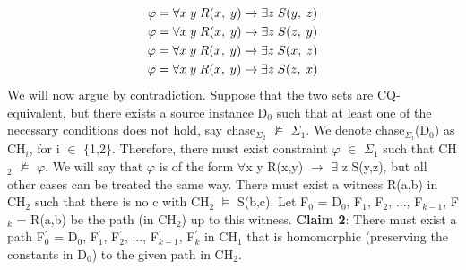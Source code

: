 \documentclass[11pt, a4paper, dvipsnames]{article}
\begin{document}
\begin{gather*}
\varphi = \forall x \hspace{0.25em} y \hspace{0.25em} R(x, \hspace{0.25em} y) \rightarrow \exists z \hspace{0.25em} S(y, \hspace{0.25em} z)\\
\varphi = \forall x \hspace{0.25em} y \hspace{0.25em} R(x, \hspace{0.25em} y) \rightarrow \exists z \hspace{0.25em} S(z, \hspace{0.25em} y)\\
\varphi = \forall x \hspace{0.25em} y \hspace{0.25em} R(x, \hspace{0.25em} y) \rightarrow \exists z \hspace{0.25em} S(x, \hspace{0.25em} z)\\
\varphi = \forall x \hspace{0.25em} y \hspace{0.25em} R(x, \hspace{0.25em} y) \rightarrow \exists z \hspace{0.25em} S(z, \hspace{0.25em} x)
\end{gather*}
We will now argue by contradiction. Suppose that the two sets are CQ-equivalent, but there exists a source instance D$_{0}$ such that at least one of the necessary conditions does not hold, say chase$_{\Sigma_{2}}$ $\nvDash$ $\Sigma_{1}$. We denote chase$_{\Sigma_{i}}$(D$_{0}$) as CH$_{i}$, for i $\in$ $\{$1,2$\}$. Therefore, there must exist constraint $\varphi$ $\in$ $\Sigma_{1}$ such that CH$_{2}$ $\nvDash$ $\varphi$. We will say that $\varphi$ is of the form $\forall$x y R(x,y) $\rightarrow$ $\exists$ z S(y,z), but all other cases can be treated the same way. There must exist a witness R(a,b) in CH$_{2}$ such that there is no c with CH$_{2}$ $\vDash$ S(b,c). Let F$_{0}$ = D$_{0}$, F$_{1}$, F$_{2}$, ..., F$_{k-1}$, F$_{k}$ = R(a,b) be the path (in CH$_{2}$) up to this witness.\newline
\textbf{Claim 2}: There must exist a path F$^{'}_{0}$ = D$_{0}$, F$^{'}_{1}$, F$^{'}_{2}$, ..., F$^{'}_{k-1}$, F$^{'}_{k}$ in CH$_{1}$ that is homomorphic (preserving the constants in D$_{0}$) to the given path in CH$_{2}$.\newline
\end{document}
